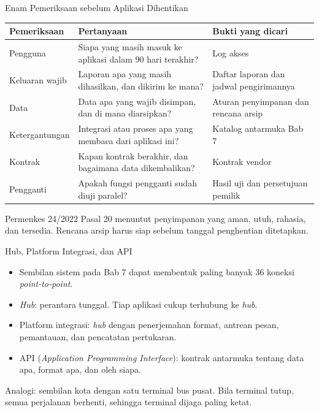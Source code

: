 \documentclass[aspectratio=169, table, 12pt]{beamer}
\begin{document}
\begin{frame}{{\Large Enam Pemeriksaan sebelum Aplikasi Dihentikan}}
  \scriptsize
  \begin{tabularx}{\textwidth}{L{2.1cm}YY}
    \hline
    \textbf{Pemeriksaan} & \textbf{Pertanyaan} & \textbf{Bukti yang dicari} \\
    \hline
    Pengguna & Siapa yang masih masuk ke aplikasi dalam 90 hari terakhir? & Log akses \\
    \hline
    Keluaran wajib & Laporan apa yang masih dihasilkan, dan dikirim ke mana? & Daftar laporan dan jadwal pengirimannya \\
    \hline
    Data & Data apa yang wajib disimpan, dan di mana diarsipkan? & Aturan penyimpanan dan rencana arsip \\
    \hline
    Ketergantungan & Integrasi atau proses apa yang membaca dari aplikasi ini? & Katalog antarmuka Bab 7 \\
    \hline
    Kontrak & Kapan kontrak berakhir, dan bagaimana data dikembalikan? & Kontrak vendor \\
    \hline
    Pengganti & Apakah fungsi pengganti sudah diuji paralel? & Hasil uji dan persetujuan pemilik \\
    \hline
  \end{tabularx}

  \vspace{6pt}
  \small Permenkes 24/2022 Pasal 20 menuntut penyimpanan yang aman, utuh, rahasia, dan tersedia.
  Rencana arsip harus siap sebelum tanggal penghentian ditetapkan.
\end{frame}

\begin{frame}{{\Large Hub, Platform Integrasi, dan API}}
  \small
  \vspace{6pt}
  \begin{itemize}
    \item Sembilan sistem pada Bab 7 dapat membentuk paling banyak 36 koneksi \textit{point-to-point}.
    \item \textit{Hub}: perantara tunggal. Tiap aplikasi cukup terhubung ke \textit{hub}.
    \item Platform integrasi: \textit{hub} dengan penerjemahan format, antrean pesan, pemantauan, dan
          pencatatan pertukaran.
    \item API (\textit{Application Programming Interface}): kontrak antarmuka tentang data apa, format
          apa, dan oleh siapa.
  \end{itemize}
  \vspace{6pt}
  Analogi: sembilan kota dengan satu terminal bus pusat. Bila terminal tutup, semua perjalanan
  berhenti, sehingga terminal dijaga paling ketat.
\end{frame}
\end{document}
